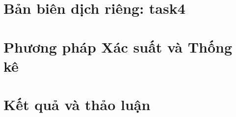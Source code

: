 \documentclass[13pt,a4paper,oneside]{extreport}
\begin{document}
\chapter*{Bản biên dịch riêng: task4}
\chapter{Phương pháp Xác suất và Thống kê}

\chapter{Kết quả và thảo luận}

\printbibliography
\end{document}
